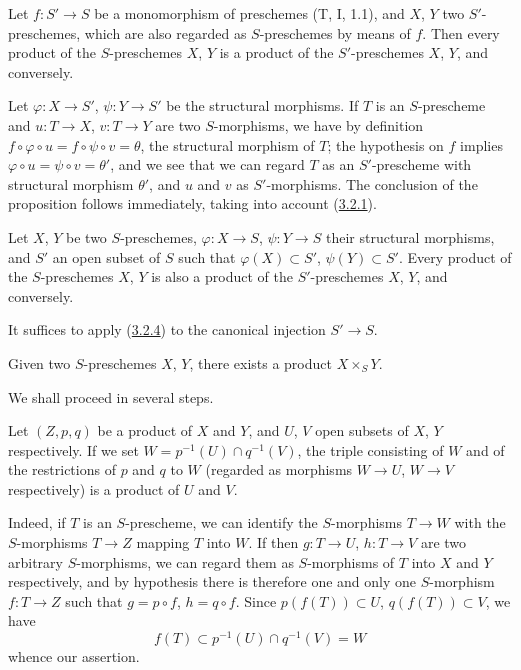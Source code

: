 \begin{proposition}[3.2.4]
\label{I.3.2.4}
Let $f:S'\to S$ be a \textup{monomorphism} of preschemes (T, I, 1.1), and $X$, $Y$ two
$S'$-preschemes, which are also regarded as $S$-preschemes by means of
$f$. Then every product of the $S$-preschemes $X$, $Y$ is a product of the
$S'$-preschemes $X$, $Y$, and conversely.
\end{proposition}

Let $\varphi:X\to S'$, $\psi:Y\to S'$ be the structural morphisms. If $T$
is an $S$-prescheme and $u:T\to X$, $v:T\to Y$ are two $S$-morphisms, we have by
definition $f\circ\varphi\circ u=f\circ\psi\circ v=\theta$, the structural
morphism of $T$; the hypothesis on $f$ implies
$\varphi\circ u=\psi\circ v=\theta'$, and we see that we can regard $T$
as an $S'$-prescheme with structural morphism $\theta'$, and $u$ and $v$ as
$S'$-morphisms. The conclusion of the proposition follows immediately,
taking into account (\hyperref[I.3.2.1]{3.2.1}).

\begin{corollary}[3.2.5]
\label{I.3.2.5}
Let $X$, $Y$ be two $S$-preschemes, $\varphi:X\to S$, $\psi:Y\to S$ their
structural morphisms, and $S'$ an open subset of $S$ such that
$\varphi(X)\subset S'$, $\psi(Y)\subset S'$. Every product of the $S$-preschemes
$X$, $Y$ is also a product of the $S'$-preschemes $X$, $Y$, and conversely.
\end{corollary}

It suffices to apply (\hyperref[I.3.2.4]{3.2.4}) to the canonical injection
$S'\to S$.

\begin{theorem}[3.2.6]
\label{I.3.2.6}
Given two $S$-preschemes $X$, $Y$, there exists a product
$X\times_S Y$.
\end{theorem}

We shall proceed in several steps.

\begin{lemma}[3.2.6.1]
\label{I.3.2.6.1}
Let $(Z,p,q)$ be a product of $X$ and $Y$, and $U$, $V$ open subsets of
$X$, $Y$ respectively. If we set
$W=p^{-1}(U)\cap q^{-1}(V)$, the triple consisting of $W$ and of the restrictions
of $p$ and $q$ to $W$ \textup{(regarded as morphisms $W\to U$,
$W\to V$ respectively)} is a product of $U$ and $V$.
\end{lemma}

Indeed, if $T$ is an $S$-prescheme, we can identify the $S$-morphisms
$T\to W$ with the $S$-morphisms $T\to Z$ mapping $T$ into $W$. If then
$g:T\to U$, $h:T\to V$ are two arbitrary $S$-morphisms, we can
regard them as $S$-morphisms of $T$ into $X$ and $Y$ respectively, and
by hypothesis there is therefore one and only one $S$-morphism $f:T\to Z$ such
that $g=p\circ f$, $h=q\circ f$. Since $p(f(T))\subset U$, $q(f(T))\subset V$,
we have
\[
  f(T)\subset p^{-1}(U)\cap q^{-1}(V)=W
\]
whence our assertion.

